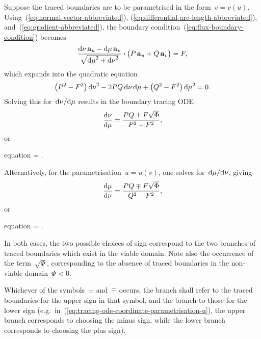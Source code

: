 Suppose the traced boundaries are to be parametrised
in the form~$v = v (u)$.
Using~(\ref{eq:normal-vector-abbreviated}),
(\ref{eq:differential-arc-length-abbreviated}),
and~(\ref{eq:gradient-abbreviated}),
the boundary condition~(\ref{eq:flux-boundary-condition}) becomes
\[
  \frac{
    \td \nu \basisvec{u} - \td \mu \basisvec{v}
  }{
    \sqrt{{\td \mu}^2 + {\td \nu}^2}
  }
    \dotp
  \roundbr[\big]{P \basisvec{u} + Q \basisvec{v}}
    =
  F,
\]
which expands into the quadratic equation
\begin{equation}
  \roundbr*{P^2 - F^2} \, {\td \nu}^2
  - 2 P Q \td \nu \td \mu
  + \roundbr*{Q^2 - F^2} \, {\td \mu}^2
    =
  0.
  \label{eq:tracing-coordinate-parametrisation-quadratic}
\end{equation}
Solving this for~$\mathop{}\!\mathrm{d} \nu / {\mathop{}\!\mathrm{d} \mu}$ results in the boundary tracing ODE
\begin{equation}
  \tder{\nu}{\mu} = \frac{P Q \pm F \sqrt{\Phi}}{P^2 - F^2},
  \label{eq:tracing-ode-coordinate-parametrisation-nu}
\end{equation}
or
\begin{important}{equation}
   =
    \frac{\scalefac[u]}{\scalefac[v]}
      \cdot
    .
  \label{eq:tracing-ode-coordinate-parametrisation-v}
\end{important}
Alternatively, for the parametrisation~$u = u (v)$,
one solves for~$\mathop{}\!\mathrm{d} \mu / {\mathop{}\!\mathrm{d} \nu}$, giving
\begin{equation}
  \tder{\mu}{\nu} = \frac{P Q \mp F \sqrt{\Phi}}{Q^2 - F^2},
  \label{eq:tracing-ode-coordinate-parametrisation-mu}
\end{equation}
or
\begin{important}{equation}
   =
    \frac{\scalefac[v]}{\scalefac[u]}
      \cdot
    .
  \label{eq:tracing-ode-coordinate-parametrisation-u}
\end{important}
In both cases, the two possible choices of sign
correspond to the two branches of traced boundaries
which exist in the viable domain.
Note also the occurrence of the term~$\sqrt{\Phi}$,
corresponding to the absence of traced boundaries
in the non-viable domain~$\Phi < 0$.

Whichever of the symbols~$\pm$ and~$\mp$ occurs,
the  branch shall refer to
the traced boundaries for the upper sign in that symbol,
and the  branch to those for the lower sign
(e.g.~in~(\ref{eq:tracing-ode-coordinate-parametrisation-u}),
the upper branch corresponds to choosing the minus sign,
while the lower branch corresponds to choosing the plus sign).

